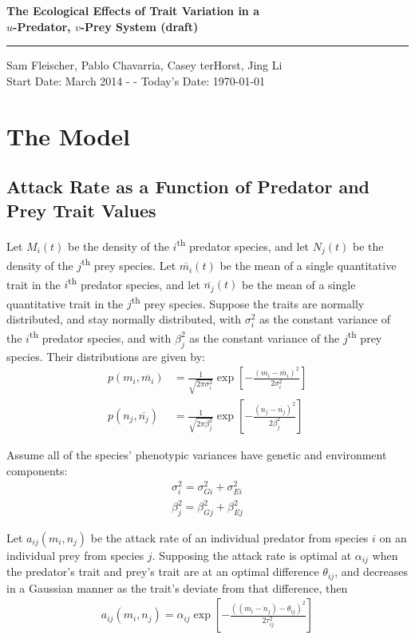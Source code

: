 \documentclass[12pt]{article}
\begin{document}
\begin{center}
	{\bf\LARGE The Ecological Effects of Trait Variation in a\\ \vskip 5pt$u$-Predator, $v$-Prey System \small (draft)}\\ \vskip 3pt \rule{4cm}{0.4pt}
	\vskip 5pt
	Sam Fleischer, Pablo Chavarria, Casey terHorst, Jing Li \\ Start Date:  March 2014 - - Today's Date: \today \rm
\end{center}

\vskip 15pt

\section*{The Model}
\subsection*{Attack Rate as a Function of Predator and Prey Trait Values}
Let $M_i(t)$ be the density of the $i$\textsuperscript{th} predator species, and let $N_j(t)$ be the density of the $j$\textsuperscript{th} prey species.  Let $\overline{m_i}(t)$ be the mean of a single quantitative trait in the $i$\textsuperscript{th} predator species, and let $\overline{n_j}(t)$ be the mean of a single quantitative trait in the $j$\textsuperscript{th} prey species.  Suppose the traits are normally distributed, and stay normally distributed, with $\sigma_i^2$ as the constant variance of the $i$\textsuperscript{th} predator species, and with $\beta_j^2$ as the constant variance of the $j$\textsuperscript{th} prey species.  Their distributions are given by:
\begin{align*}
	p(m_i, \overline{m_i}) &= \frac{1}{\sqrt{2\pi\sigma_i^2}}\exp\left[{-\frac{(m_i - \overline{m_i})^2}{2\sigma_i^2}}\right] \\
	p(n_j, \overline{n_j}) &= \frac{1}{\sqrt{2\pi\beta_j^2}}\exp\left[{-\frac{(n_j - \overline{n_j})^2}{2\beta_j^2}}\right]
\end{align*}

\noindent Assume all of the species' phenotypic variances have genetic and environment components:
\begin{align*}
	\sigma_i^2 = \sigma_{Gi}^2 + \sigma_{Ei}^2 \\
	\beta_j^2 = \beta_{Gj}^2 + \beta_{Ej}^2
\end{align*}

\noindent Let $a_{ij}(m_i, n_j)$ be the attack rate of an individual predator from species $i$ on an individual prey from species $j$.  Supposing the attack rate is optimal at $\alpha_{ij}$ when the predator's trait and prey's trait are at an optimal difference $\theta_{ij}$, and decreases in a Gaussian manner as the trait's deviate from that difference, then
\begin{align*}
	a_{ij}(m_i, n_j) = \alpha_{ij} \exp\left[{-\frac{((m_i - n_j) - \theta_{ij})^2}{2\tau_{ij}^2}}\right]
\end{align*}
\end{document}
